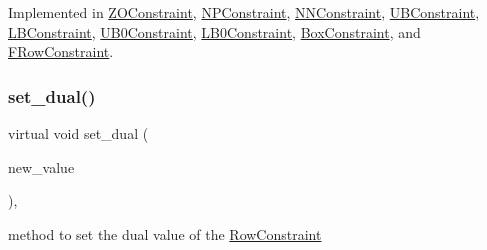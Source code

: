 Implemented in \mbox{\hyperlink{class_s_m_spp__di__unipi__it_1_1_z_o_constraint_aca9b52dad8cd2c7a830d2ebfe0ac31f3}{Z\+O\+Constraint}}, \mbox{\hyperlink{class_s_m_spp__di__unipi__it_1_1_n_p_constraint_aca9b52dad8cd2c7a830d2ebfe0ac31f3}{N\+P\+Constraint}}, \mbox{\hyperlink{class_s_m_spp__di__unipi__it_1_1_n_n_constraint_aca9b52dad8cd2c7a830d2ebfe0ac31f3}{N\+N\+Constraint}}, \mbox{\hyperlink{class_s_m_spp__di__unipi__it_1_1_u_b_constraint_aca9b52dad8cd2c7a830d2ebfe0ac31f3}{U\+B\+Constraint}}, \mbox{\hyperlink{class_s_m_spp__di__unipi__it_1_1_l_b_constraint_aca9b52dad8cd2c7a830d2ebfe0ac31f3}{L\+B\+Constraint}}, \mbox{\hyperlink{class_s_m_spp__di__unipi__it_1_1_u_b0_constraint_aca9b52dad8cd2c7a830d2ebfe0ac31f3}{U\+B0\+Constraint}}, \mbox{\hyperlink{class_s_m_spp__di__unipi__it_1_1_l_b0_constraint_aca9b52dad8cd2c7a830d2ebfe0ac31f3}{L\+B0\+Constraint}}, \mbox{\hyperlink{class_s_m_spp__di__unipi__it_1_1_box_constraint_a6f44fbb5f6b5aebd5f78d7593dc6e000}{Box\+Constraint}}, and \mbox{\hyperlink{class_s_m_spp__di__unipi__it_1_1_f_row_constraint_a6f44fbb5f6b5aebd5f78d7593dc6e000}{F\+Row\+Constraint}}.

\mbox{\label{class_s_m_spp__di__unipi__it_1_1_row_constraint_a979cec8c2f8fd20c81a39e191d480f4f}} 
\subsubsection{\texorpdfstring{set\+\_\+dual()}{set\_dual()}}
{\footnotesize\ttfamily virtual void set\+\_\+dual (\begin{DoxyParamCaption}\item[{\mbox{\hyperlink{class_s_m_spp__di__unipi__it_1_1_row_constraint_a34abd4b01d3a2024be5f6d13dd88779f}{c\+\_\+\+R\+H\+S\+Value}}}]{new\+\_\+value }\end{DoxyParamCaption})\hspace{0.3cm}{\ttfamily [inline]}, {\ttfamily [virtual]}}



method to set the dual value of the \mbox{\hyperlink{class_s_m_spp__di__unipi__it_1_1_row_constraint}{Row\+Constraint}} 


